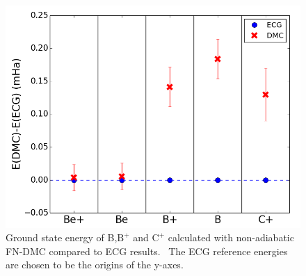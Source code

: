 \documentclass[pra,superscriptaddress,groupedaddress,twocolumn]{revtex4}
\begin{document}
\begin{figure}
\centering
\includegraphics[scale=.4]{Figures/atom-ECG}
\caption{Ground state energy of B,$\text{B}^+$ and $\text{C}^+$ calculated with non-adiabatic FN-DMC compared to ECG results.~\cite{Bubin_B,Bubin_B+,Bubin_C+} The ECG reference energies are chosen to be the origins of the y-axes. \label{fig:ECG-atoms}}
\end{figure}
\end{document}
